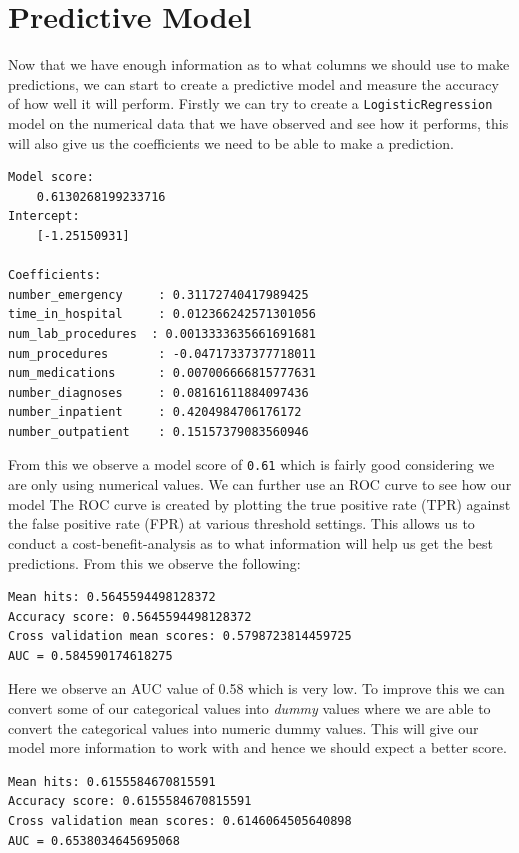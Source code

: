 \documentclass[11pt]{report}
\begin{document}
\newpage
\section{Predictive Model}
\noindent
Now that we have enough information as to what columns we should use to make predictions, we can start to create a predictive model and measure the accuracy of how well it will perform. Firstly we can try to create a \texttt{LogisticRegression} model on the numerical data that we have observed and see how it performs, this will also give us the coefficients we need to be able to make a prediction.

\begin{lstlisting}
Model score:
	0.6130268199233716
Intercept:
	[-1.25150931]
	
Coefficients:
number_emergency     : 0.31172740417989425
time_in_hospital     : 0.012366242571301056
num_lab_procedures  : 0.0013333635661691681
num_procedures       : -0.04717337377718011
num_medications      : 0.007006666815777631
number_diagnoses     : 0.08161611884097436
number_inpatient     : 0.4204984706176172
number_outpatient    : 0.15157379083560946
\end{lstlisting}
\noindent
From this we observe a model score of \texttt{0.61} which is fairly good considering we are only using numerical values. We can further use an ROC curve to see how our model The ROC curve is created by plotting the true positive rate (TPR) against the false positive rate (FPR) at various threshold settings. This allows us to conduct a cost-benefit-analysis as to what information will help us get the best predictions. From this we observe the following:

\begin{lstlisting}
Mean hits: 0.5645594498128372
Accuracy score: 0.5645594498128372
Cross validation mean scores: 0.5798723814459725
AUC = 0.584590174618275
\end{lstlisting}

\noindent
Here we observe an AUC value of 0.58 which is very low. To improve this we can convert some of our categorical values into \textit{dummy} values where we are able to convert the categorical values into numeric dummy values. This will give our model more information to work with and hence we should expect a better score. 

\begin{lstlisting}
Mean hits: 0.6155584670815591
Accuracy score: 0.6155584670815591
Cross validation mean scores: 0.6146064505640898
AUC = 0.6538034645695068
\end{lstlisting}
\end{document}
